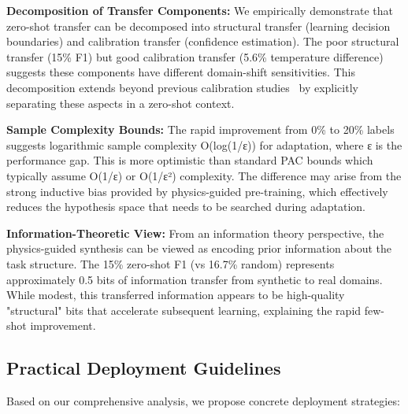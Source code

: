 \documentclass[journal]{IEEEtran}
\begin{document}
\textbf{Decomposition of Transfer Components:} We empirically demonstrate that zero-shot transfer can be decomposed into structural transfer (learning decision boundaries) and calibration transfer (confidence estimation). The poor structural transfer (15\% F1) but good calibration transfer (5.6\% temperature difference) suggests these components have different domain-shift sensitivities. This decomposition extends beyond previous calibration studies~\cite{ovadia2019trust} by explicitly separating these aspects in a zero-shot context.

\textbf{Sample Complexity Bounds:} The rapid improvement from 0\% to 20\% labels suggests logarithmic sample complexity O(log(1/ε)) for adaptation, where ε is the performance gap. This is more optimistic than standard PAC bounds which typically assume O(1/ε) or O(1/ε²) complexity. The difference may arise from the strong inductive bias provided by physics-guided pre-training, which effectively reduces the hypothesis space that needs to be searched during adaptation.

\textbf{Information-Theoretic View:} From an information theory perspective, the physics-guided synthesis can be viewed as encoding prior information about the task structure. The 15\% zero-shot F1 (vs 16.7\% random) represents approximately 0.5 bits of information transfer from synthetic to real domains. While modest, this transferred information appears to be high-quality "structural" bits that accelerate subsequent learning, explaining the rapid few-shot improvement.

\subsection{Practical Deployment Guidelines}

Based on our comprehensive analysis, we propose concrete deployment strategies:
\end{document}
